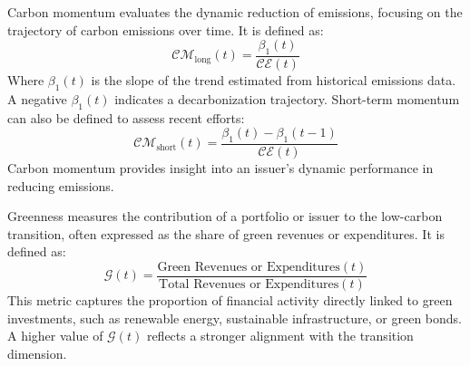 \begin{definition}
    Carbon momentum evaluates the dynamic reduction of emissions, focusing on the trajectory of carbon emissions over time. It is defined as:
    \begin{equation}
        \mathcal{CM}_{\text{long}}(t) = \frac{\beta_1(t)}{\mathcal{CE}(t)}
    \end{equation}
    Where $\beta_1(t)$ is the slope of the trend estimated from historical emissions data. A negative $\beta_1(t)$ indicates a decarbonization trajectory. Short-term momentum can also be defined to assess recent efforts:
    \begin{equation}
        \mathcal{CM}_{\text{short}}(t) = \frac{\beta_1(t) - \beta_1(t-1)}{\mathcal{CE}(t)}
    \end{equation}
    Carbon momentum provides insight into an issuer's dynamic performance in reducing emissions.
\end{definition}

\begin{definition}[Greenness]
    Greenness measures the contribution of a portfolio or issuer to the low-carbon transition, often expressed as the share of green revenues or expenditures. It is defined as:
    \begin{equation}
        \mathcal{G}(t) = \frac{\text{Green Revenues or Expenditures}(t)}{\text{Total Revenues or Expenditures}(t)}
    \end{equation}
    This metric captures the proportion of financial activity directly linked to green investments, such as renewable energy, sustainable infrastructure, or green bonds. A higher value of $\mathcal{G}(t)$ reflects a stronger alignment with the transition dimension.
\end{definition}
